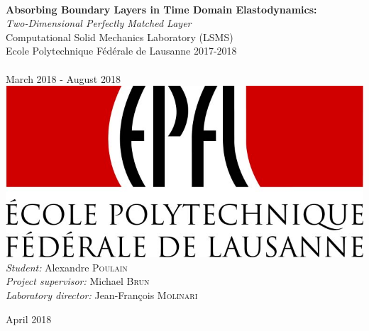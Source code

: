 \begin{titlepage}
\begin{sffamily}
\begin{center}
    \vspace*{2cm}
    \noindent\hrulefill \\
    \vspace*{1cm}
    {\huge \bfseries Absorbing Boundary Layers in Time Domain Elastodynamics: }\\[0.5cm]
    {\huge  \itshape Two-Dimensional Perfectly Matched Layer} \\[0.5cm]
    {\large Computational Solid Mechanics Laboratory  (LSMS)}\\[0.5cm]
    {\large Ecole Polytechnique Fédérale de Lausanne 2017-2018}\\[1cm]
    \noindent\hrulefill \\
    \vspace{2cm}
    March 2018 - August 2018 \\[1cm]
    


      \includegraphics{images/EPFL-Logo.jpg}\\[1cm]
      

    \emph{Student:} Alexandre \textsc{Poulain}\\[1cm]
    \emph{Project supervisor:} Michael \textsc{Brun}\\[1cm]
    \emph{Laboratory director:} Jean-François \textsc{Molinari}

    
    
    \vfill{\large April 2018}

\end{center}
\end{sffamily}
\end{titlepage}